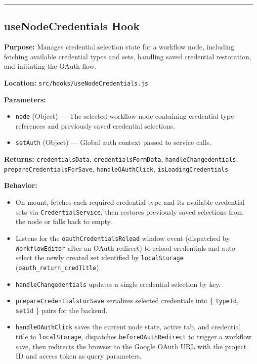 \vfill
\hrule
\vspace{0.5cm}

\subsection*{useNodeCredentials Hook}

\textbf{Purpose:} Manages credential selection state for a workflow node, including fetching available credential types and sets, handling saved credential restoration, and initiating the OAuth flow.

\textbf{Location:} \texttt{src/hooks/useNodeCredentials.js}

\textbf{Parameters:}
\begin{itemize}
    \item \texttt{node} (Object) --- The selected workflow node containing credential type references and previously saved credential selections.
    \item \texttt{setAuth} (Object) --- Global auth context passed to service calls.
\end{itemize}

\textbf{Returns:} \texttt{credentialsData}, \texttt{credentialsFormData}, \texttt{handleChangedentials}, \texttt{prepareCredentialsForSave}, \texttt{handleOAuthClick}, \texttt{isLoadingCredentials}

\textbf{Behavior:}
\begin{itemize}
    \item On mount, fetches each required credential type and its available credential sets via \texttt{CredentialService}, then restores previously saved selections from the node or falls back to empty.
    \item Listens for the \texttt{oauthCredentialsReload} window event (dispatched by \texttt{WorkflowEditor} after an OAuth redirect) to reload credentials and auto-select the newly created set identified by \texttt{localStorage} (\texttt{oauth\_return\_credTitle}).
    \item \texttt{handleChangedentials} updates a single credential selection by key.
    \item \texttt{prepareCredentialsForSave} serializes selected credentials into \{ \texttt{typeId}, \texttt{setId} \} pairs for the backend.
    \item \texttt{handleOAuthClick} saves the current node state, active tab, and credential title to \texttt{localStorage}, dispatches \texttt{beforeOAuthRedirect} to trigger a workflow save, then redirects the browser to the Google OAuth URL with the project ID and access token as query parameters.
\end{itemize}

